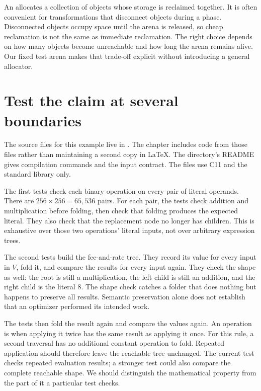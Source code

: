 An  allocates a collection of objects whose storage is reclaimed together.
It is often convenient for transformations that disconnect objects during a phase.
Disconnected objects occupy space until the arena is released, so cheap reclamation is not the same as immediate reclamation.
The right choice depends on how many objects become unreachable and how long the arena remains alive.
Our fixed test arena makes that trade-off explicit without introducing a general allocator.

\section{Test the claim at several boundaries}
\label{sec:tiny-fold-testing}

The source files for this example live in .
The chapter includes code from those files rather than maintaining a second copy in LaTeX.
The directory's README gives compilation commands and the input contract.
The files use C11 and the standard library only.

The first tests check each binary operation on every pair of literal operands.
There are $256\times256=65{,}536$ pairs.
For each pair, the tests check addition and multiplication before folding, then check that folding produces the expected literal.
They also check that the replacement node no longer has children.
This is exhaustive over those two operations' literal inputs, not over arbitrary expression trees.

The second tests build the fee-and-rate tree.
They record its value for every input in $V$, fold it, and compare the results for every input again.
They check the shape as well: the root is still a multiplication, the left child is still an addition, and the right child is the literal $8$.
The shape check catches a folder that does nothing but happens to preserve all results.
Semantic preservation alone does not establish that an optimizer performed its intended work.

The tests then fold the result again and compare the values again.
An operation is  when applying it twice has the same result as applying it once.
For this rule, a second traversal has no additional constant operation to fold.
Repeated application should therefore leave the reachable tree unchanged.
The current test checks repeated evaluation results; a stronger test could also compare the complete reachable shape.
We should distinguish the mathematical property from the part of it a particular test checks.

